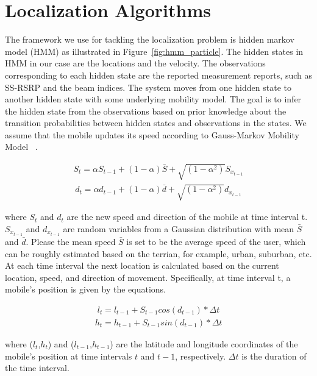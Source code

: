 \documentclass[conference, 10pt]{IEEEtran}
\begin{document}
\section{Localization Algorithms}
\label{sec:localalgo}

The framework we use for tackling the localization problem is hidden markov model (HMM) as illustrated 
in Figure~\ref{fig:hmm_particle}. The hidden states in HMM in our case are the locations and the velocity. 
The observations corresponding to each hidden state are the reported measurement reports, such as SS-RSRP and the beam indices.
The system moves from one hidden state to another hidden state with some underlying mobility model. 
The goal is to infer the hidden state from the observations based on
prior knowledge about the transition probabilities between hidden states and
observations in the states. We assume that the mobile updates its speed according to Gauss-Markov Mobility Model ~\cite{Camp2002}.

\begin{align}
S_t = \alpha S_{t-1}+(1-\alpha)\bar{S}+\sqrt{(1-\alpha^2)}S_{x_{t-1}}
\label{eqn:speed}
\end{align}
\begin{align}
d_t = \alpha d_{t-1}+(1-\alpha)\bar{d}+\sqrt{(1-\alpha^2)}d_{x_{t-1}}
\label{eqn:speed}
\end{align}

 where $S_t$ and $d_t$ are the new speed and direction of the mobile at time interval t. $S_{x_{t-1}}$ and $d_{x_{t-1}}$
 are random variables from a Gaussian distribution with mean $\bar{S}$ and $\bar{d}$.
 Please the mean speed $\bar{S}$ is set to be the average speed of the user, which can be roughly estimated based on the terrian, for example, urban, suburban, etc.
 At each time interval the next location is calculated based on the current location, speed, and direction of movement.
Specifically, at time interval t, a mobile's position is given by the equations.

\begin{align}
	l_t = l_{t-1} +S_{t-1}cos(d_{t-1})*\Delta t
\label{eqn:mobilitymodelx}
\end{align}
\begin{align}
h_t = h_{t-1} +S_{t-1}sin(d_{t-1})*\Delta t
\label{eqn:mobilitymodely}
\end{align}

where ($l_t$,$h_t$) and ($l_{t-1}$,$h_{t-1}$) are the latitude and longitude coordinates of the mobile’s position 
at time intervals $t$ and $t-1$, respectively. $\Delta t$ is the duration of the time interval.
\end{document}
